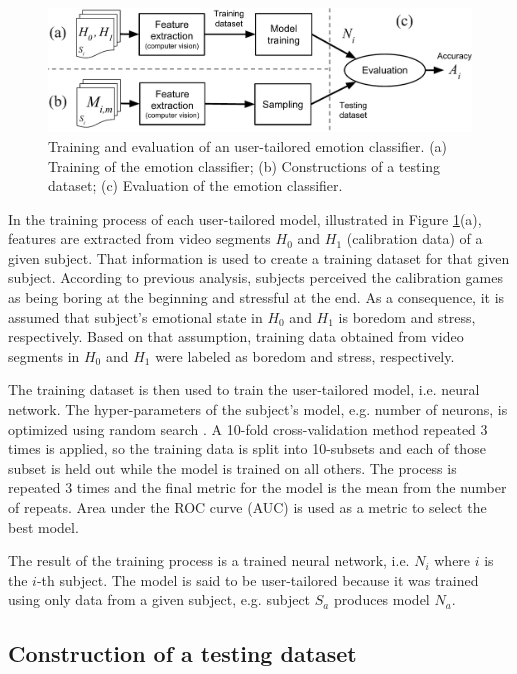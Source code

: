 \begin{figure}[ht]
    \centering
    \includegraphics[width=\textwidth]{Content/figures/experiment2-training-evaluation}
    \caption{Training and evaluation of an user-tailored emotion classifier. (a) Training of the emotion classifier; (b) Constructions of a testing dataset; (c) Evaluation of the emotion classifier.}
    \label{fig:experiment2-training-evaluation}
\end{figure}

In the training process of each user-tailored model, illustrated in Figure \ref{fig:experiment2-training-evaluation}(a), features are extracted from video segments $H_0$ and $H_1$ (calibration data) of a given subject. That information is used to create a training dataset for that given subject. According to previous analysis, subjects perceived the calibration games as being boring at the beginning and stressful at the end. As a consequence, it is assumed that subject's emotional state in $H_0$ and $H_1$ is boredom and stress, respectively. Based on that assumption, training data obtained from video segments in $H_0$ and $H_1$ were labeled as boredom and stress, respectively.

The training dataset is then used to train the user-tailored model, i.e. neural network. The hyper-parameters of the subject's model, e.g. number of neurons, is optimized using random search \parencite{bergstra2012random}. A 10-fold cross-validation method repeated 3 times is applied, so the training data is split into 10-subsets and each of those subset is held out while the model is trained on all others. The process is repeated 3 times and the final metric for the model is the mean from the number of repeats. Area under the ROC curve (AUC) is used as a metric to select the best model.

The result of the training process is a trained neural network, i.e. $N_i$ where $i$ is the $i$-th subject. The model is said to be user-tailored because it was trained using only data from a given subject, e.g. subject $S_a$ produces model $N_a$.

\subsection{Construction of a testing dataset}
\label{sec:experiment2-construction-validation}

